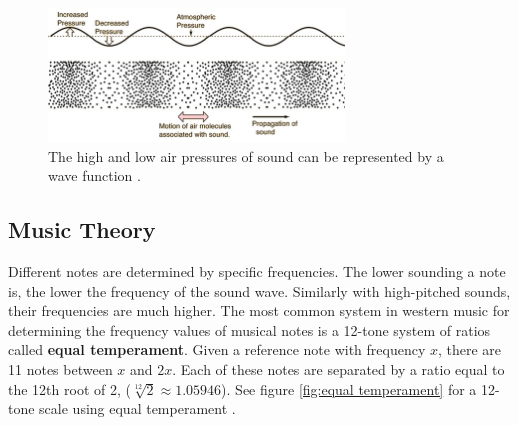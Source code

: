 \documentclass[10pt]{article}
\begin{document}
\begin{figure}[h]
    \centering
    \includegraphics[width=0.7\textwidth]{Sound Waves JPG}
    \caption{The high and low air pressures of sound can be represented by a wave function \cite{nave2017hyperphysics}.} 
    \label{fig:sound wave 1}
\end{figure}

\subsection{Music Theory}
\hspace{\parindent}Different notes are determined by specific frequencies. The lower sounding a note is, the lower the frequency of the sound wave. Similarly with high-pitched sounds, their frequencies are much higher. The most common system in western music for determining the frequency values of musical notes is a 12-tone system of ratios called \textbf{equal temperament}. Given a reference note with frequency $x$, there are 11 notes between $x$ and $2x$. Each of these notes are separated by a ratio equal to the 12th root of 2, ($\sqrt[12]{2}\approx1.05946$). See figure \ref{fig:equal temperament} for a 12-tone scale using equal temperament  \cite{tuningSystems} \cite{boatwright1956musictheory}.
\end{document}

